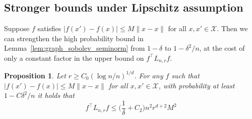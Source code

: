 \documentclass[twoside]{article}
\newcommand{\1}{\mathbf{1}}
\newcommand{\Lap}{L}
\newcommand{\mc}[1]{\mathcal{#1}}
\newtheorem{proposition}{Proposition}
\theoremstyle{definition}
\theoremstyle{remark}
\begin{document}
\subsection{Stronger bounds under Lipschitz assumption}
Suppose $f$ satisfies $|f(x') - f(x)| \leq M \|x - x\|$ for all $x,x' \in \mc{X}$. Then we can strengthen the high probability bound in Lemma~\ref{lem:graph_sobolev_seminorm} from $1 - \delta$ to $1 - \delta^2/n$, at the cost of only a constant factor in the upper bound on $f^{\top} \Lap_{n,r} f$.
\begin{proposition}
	\label{prop:graph_sobolev_seminorm_lipschitz}
	Let $r \geq C_0(\log n/n)^{1/d}$. For any $f$ such that $|f(x') - f(x)| \leq M \|x - x\|$ for all $x,x' \in \mc{X}$, with probability at least $1 - C\delta^2/n$ it holds that
	\begin{equation*}
	f^{\top} \Lap_{n,r} f \leq \biggl(\frac{1}{\delta} + C_2\biggr) n^2 r^{d + 2} M^2
	\end{equation*}
\end{proposition}
\end{document}

